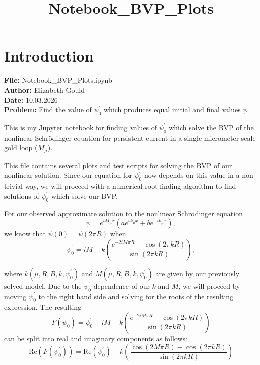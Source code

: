\documentclass[11pt]{article}
\title{Notebook\_BVP\_Plots}
\begin{document}
    
    \maketitle
    
    

    
    \hypertarget{introduction}{%
\section{Introduction}\label{introduction}}

    \textbf{File:} Notebook\_BVP\_Plots.ipynb\\
\textbf{Author:} Elizabeth Gould\\
\textbf{Date:} 10.03.2026\\
\textbf{Problem:} Find the value of \(\psi^\prime_0\) which produces
equal initial and final values \(\psi\)

    This is my Jupyter notebook for finding values of \(\psi^\prime_0\)
which solve the BVP of the nonlinear Schrödinger equation for persistent
current in a single micrometer scale gold loop (\(M_{\mu}\)).

This file contains several plots and test scripts for solving the BVP of
our nonlinear solution. Since our equation for \(\psi^\prime_0\) now
depends on this value in a non-trivial way, we will proceed with a
numerical root finding algorithm to find solutions of \(\psi^\prime_0\)
which solve our BVP.

For our observed approximate solution to the nonlinear Schrödinger
equation \begin{equation}
\psi = e^{i M_{\mu} x} \left( a e^{i k_{\mu} x} + b e^{- i k_{\mu} x} \right),
\end{equation} we know that \(\psi(0) = \psi(2\pi R)\) when
\begin{equation}
\psi^\prime_0 = i M + k \left( \frac{e^{- 2 i M\pi R} - \cos\left( 2\pi k R \right)}{\sin\left(2\pi k R\right)}\right),
\end{equation}

where \(k\left(\mu, R, B, k, \psi^\prime_0 \right)\) and
\(M\left(\mu, R, B, k, \psi^\prime_0 \right)\) are given by our
previously solved model. Due to the \(\psi^\prime_0\) dependence of our
\(k\) and \(M\), we will proceed by moving \(\psi^\prime_0\) to the
right hand side and solving for the roots of the resulting expression.
The resulting \begin{equation}
F(\psi^\prime_0) =  \psi^\prime_0 - i M - k \left( \frac{e^{- 2 i M\pi R} - \cos\left( 2\pi k R \right)}{\sin\left(2\pi k R\right)}\right)
\end{equation} can be split into real and imaginary components as
follows: \begin{equation}
\mathrm{Re}\left(F\left(\psi^\prime_0\right)\right) =  \mathrm{Re}\left(\psi^\prime_0\right) - k \left( \frac{\cos\left(2 M\pi R\right) - \cos\left( 2\pi k R \right)}{\sin\left(2\pi k R\right)}\right)
\end{equation}
\end{document}
